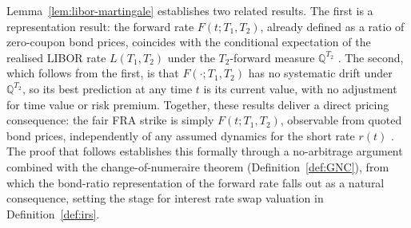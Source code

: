     \noindent
    Lemma~\ref{lem:libor-martingale} establishes two related results. The first is a representation result: the forward rate $F(t;T_1,T_2)$, already defined as a ratio of zero-coupon bond prices, coincides with the conditional expectation of the realised LIBOR rate $L(T_1,T_2)$ under the $T_2$-forward measure $\mathbb{Q}^{T_2}$ \cite{brigo2001interest}. The second, which follows from the first, is that $F(\cdot;T_1,T_2)$ has no systematic drift under $\mathbb{Q}^{T_2}$, so its best prediction at any time $t$ is its current value, with no adjustment for time value or risk premium. Together, these results deliver a direct pricing consequence: the fair FRA strike is simply $F(t;T_1,T_2)$, observable from quoted bond prices, independently of any assumed dynamics for the short rate $r(t)$ \cite{oosterlee2019mathematical}. The proof that follows establishes this formally through a no-arbitrage argument combined with the change-of-numeraire theorem (Definition~\ref{def:GNC}), from which the bond-ratio representation of the forward rate falls out as a natural consequence, setting the stage for interest rate swap valuation in Definition~\ref{def:irs}.

